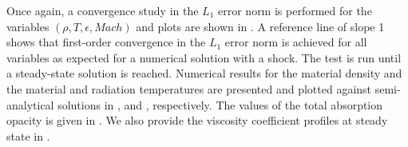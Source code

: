 \documentclass[times,doublespace]{fldauth}%
\begin{document}
Once again, a convergence study in the $L_1$ error norm is performed for the variables $(\rho, T, \epsilon, Mach)$ and plots are shown in  . A reference line of slope 1 shows that first-order convergence in the $L_1$ error norm is achieved for all variables as expected for a numerical solution with a shock.
The test is run until a steady-state solution is reached. Numerical results for the material density and the material and radiation temperatures are presented and plotted against semi-analytical solutions in ,  and , respectively. The values of the total absorption opacity is given in . We also provide the viscosity coefficient profiles at steady state in .
%
\end{document}
